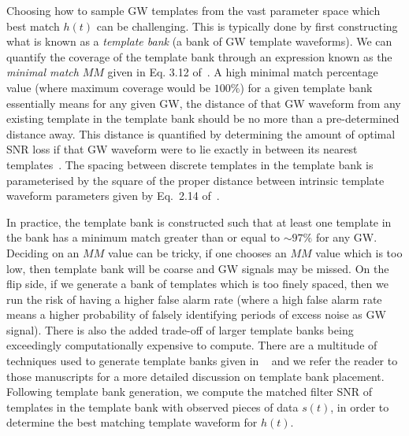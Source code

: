 %
%
%

%
%
Choosing how to sample \ac{GW} templates from the vast 
parameter space which best match $h(t)$ can be 
challenging. This is typically done by first constructing 
what is known as a \textit{template bank} (a bank of \ac{GW} 
template waveforms). We can quantify the coverage 
of the template bank through an expression known as the \textit{minimal match} 
$MM$ given in Eq. 3.12 of~\cite{0264-9381-23-18-002}. A high minimal 
match percentage value (where maximum coverage would be $100\%$) 
for a given template bank essentially means 
for any given \ac{GW}, the distance of that \ac{GW} waveform from 
any existing template in the template bank should be no more 
than a pre-determined distance away. This distance is quantified by 
determining the amount of optimal \ac{SNR} loss if that 
\ac{GW} waveform were to lie exactly in between its nearest 
templates~\cite{PhysRevD.53.6749}.
The spacing 
between discrete templates in the template bank is 
parameterised by the square of the proper 
distance between intrinsic template waveform parameters given 
by Eq.~2.14 of~\cite{PhysRevD.53.6749}. 

In practice, the template bank is constructed 
such that at least one template in the bank has a 
minimum match greater than or equal to $\sim 97\%$ for any 
\ac{GW}. Deciding on an $MM$ value can be tricky,  
if one chooses an $MM$ value which is too low, 
then template bank will be coarse and \ac{GW} signals 
may be missed. On the flip side, if we generate a bank 
of templates which is too finely spaced, then we run the risk of 
having a higher false alarm rate (where a high false alarm 
rate means a higher probability of falsely identifying 
periods of excess noise as \ac{GW} signal). There is also 
the added trade-off of larger template banks being 
exceedingly computationally expensive to compute. There are
a multitude of techniques used to generate template banks  
given in ~\cite{PhysRevD.49.1707,PhysRevD.53.6749,PhysRevD.60.022002,
2006CQGra..23.5477B,PhysRevD.80.104014,PhysRevD.86.084017,PhysRevD.89.084041,
PhysRevD.89.024003,2016arXiv160203509C,PhysRevD.89.024010} and 
we refer the reader to those manuscripts for a more detailed discussion on 
template bank placement. Following template bank generation, 
we compute the matched filter \ac{SNR} of templates in the 
template bank with observed pieces of data $s(t)$, in order to 
determine the best matching template waveform for $h(t)$.

